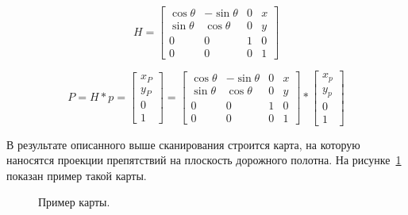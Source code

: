 \begin{equation}
	H = 
	\begin{bmatrix}
		\cos{\theta} & -\sin{\theta} & 0 & x \\
		\sin{\theta} & \cos{\theta} & 0 & y \\
		0 & 0 & 1 & 0\\
		0 & 0 & 0 & 1
	\end{bmatrix}
\end{equation}

\begin{equation}
	P = H * p = 
	\begin{bmatrix}
		x_P\\ y_P\\0\\1
	\end{bmatrix}
	= 
	\begin{bmatrix}
		\cos{\theta} & -\sin{\theta} & 0 & x \\
		\sin{\theta} & \cos{\theta} & 0 & y \\
		0 & 0 & 1 & 0\\
		0 & 0 & 0 & 1
	\end{bmatrix} 
	*
	\begin{bmatrix}
		x_p \\ y_p \\ 0\\ 1
	\end{bmatrix}
\end{equation}

В результате описанного выше сканирования строится карта, на которую наносятся проекции препятствий на плоскость дорожного полотна. На рисунке~\ref{map} показан пример такой карты.

\begin{figure}[h!]
	\begin{minipage}[h]{0.47\textwidth}
	\end{minipage}
	\hfill
	\begin{minipage}[h]{0.47\textwidth}
	\end{minipage}
	\caption{Пример карты.}
	\label{map}
\end{figure}


